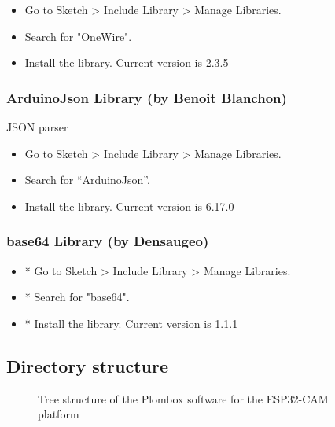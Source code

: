 \documentclass[a4paper,11pt]{article}
\begin{document}
\begin{itemize}
\item Go to Sketch > Include Library > Manage Libraries.
\item Search for "OneWire".
\item Install the library. Current version is 2.3.5
\end{itemize}

\subsubsection{ ArduinoJson Library (by Benoit Blanchon)}
JSON parser

\begin{itemize}
	\item Go to Sketch > Include Library > Manage Libraries.
	\item Search for ``ArduinoJson''.
	\item Install the library. Current version is 6.17.0
\end{itemize}

\subsubsection{ base64 Library (by Densaugeo)}
\begin{itemize}
\item * Go to Sketch > Include Library > Manage Libraries.
\item * Search for "base64".
\item * Install the library. Current version is 1.1.1
\end{itemize}

	\subsection{Directory structure}

\begin{figure}[!h]
  \centering
	\caption{Tree structure of the Plombox software for the ESP32-CAM platform}
  \label{fig_tree_dir}
\end{figure}
\end{document}
